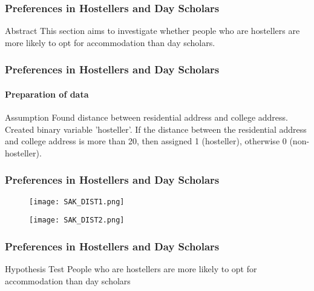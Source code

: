 \documentclass{beamer}
\begin{document}
\begin{frame}
\frametitle{Preferences in Hostellers and Day
Scholars}
\begin{block}{Abstract}
This section aims to investigate whether people who are hostellers are more likely to opt for accommodation than day scholars.
\end{block}
\end{frame}

\begin{frame}
\frametitle{Preferences in Hostellers and Day
Scholars}
\framesubtitle{Preparation of data}
\begin{block}{Assumption}
Found distance between residential address and college address. Created binary variable 'hosteller'. If the distance between the residential address and college address is more than 20, then assigned 1 (hosteller), otherwise 0 (non-hosteller).
\end{block}
\end{frame}


\begin{frame}
\frametitle{Preferences in Hostellers and Day Scholars}
    \begin{figure}[ht]
        \begin{minipage}[b]{0.45\linewidth}
            \centering
            \texttt{[image: SAK\_DIST1.png]}
            \label{fig:a}
        \end{minipage}
        \hspace{0.5cm}
        \begin{minipage}[b]{0.45\linewidth}
            \centering
            \texttt{[image: SAK\_DIST2.png]}
            \label{fig:b}
        \end{minipage}
    \end{figure}
\end{frame}

\begin{frame}
\frametitle{Preferences in Hostellers and Day
Scholars}
\begin{block}{Hypothesis Test}
People who are hostellers are more likely to opt for
accommodation than day scholars
\end{block}
\end{frame}
\end{document}
